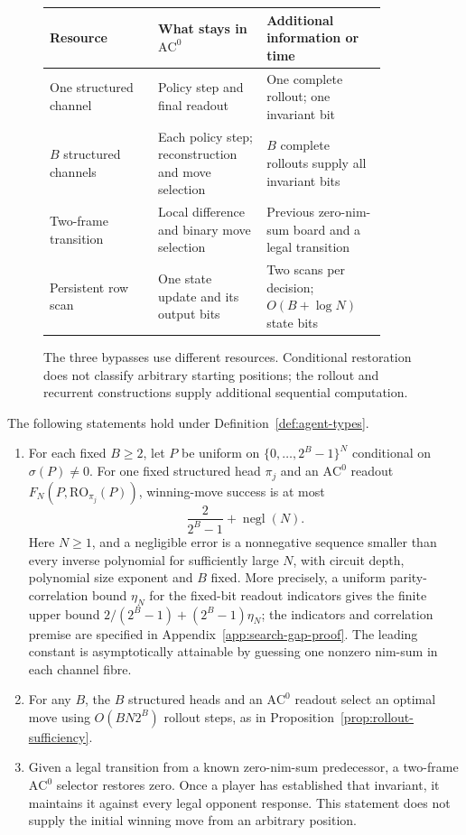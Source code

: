 \documentclass[twoside,11pt]{article}
\newcommand{\AC}{\mathrm{AC}}
\numberwithin{theorem}{section}
\numberwithin{equation}{section}
\begin{document}
\begin{figure}[t]
\centering
\begin{tabular}{>{\raggedright\arraybackslash}p{0.28\linewidth}>{\raggedright\arraybackslash}p{0.29\linewidth}>{\raggedright\arraybackslash}p{0.31\linewidth}}
\hline
\textbf{Resource} & \textbf{What stays in $\AC^0$} & \textbf{Additional information or time} \\
\hline
One structured channel & Policy step and final readout & One complete rollout; one invariant bit \\
$B$ structured channels & Each policy step; reconstruction and move selection & $B$ complete rollouts supply all invariant bits \\
Two-frame transition & Local difference and binary move selection & Previous zero-nim-sum board and a legal transition \\
Persistent row scan & One state update and its output bits & Two scans per decision; $O(B+\log N)$ state bits \\
\hline
\end{tabular}
\caption{The three bypasses use different resources. Conditional restoration does not classify arbitrary starting positions; the rollout and recurrent constructions supply additional sequential computation.}
\label{fig:rollout_gap}
\end{figure}

\begin{theorem}
\label{thm:search-gap}
The following statements hold under Definition~\ref{def:agent-types}.
\begin{enumerate}
\item[\textup{(i)}] For each fixed $B\ge2$, let $P$ be uniform on $\{0,\ldots,2^B-1\}^N$ conditional on $\sigma(P)\ne0$. For one fixed structured head $\pi_j$ and an $\AC^0$ readout $F_N(P,\mathrm{RO}_{\pi_j}(P))$, winning-move success is at most
\[
\frac{2}{2^B-1}+\operatorname{negl}(N).
\]
Here $N\ge1$, and a negligible error is a nonnegative sequence smaller than every inverse polynomial for sufficiently large $N$, with circuit depth, polynomial size exponent and $B$ fixed. More precisely, a uniform parity-correlation bound $\eta_N$ for the fixed-bit readout indicators gives the finite upper bound $2/(2^B-1)+(2^B-1)\eta_N$; the indicators and correlation premise are specified in Appendix~\ref{app:search-gap-proof}. The leading constant is asymptotically attainable by guessing one nonzero nim-sum in each channel fibre.
\item[\textup{(ii)}] For any $B$, the $B$ structured heads and an $\AC^0$ readout select an optimal move using $O(BN2^B)$ rollout steps, as in Proposition~\ref{prop:rollout-sufficiency}.
\item[\textup{(iii)}] Given a legal transition from a known zero-nim-sum predecessor, a two-frame $\AC^0$ selector restores zero. Once a player has established that invariant, it maintains it against every legal opponent response. This statement does not supply the initial winning move from an arbitrary position.
\end{enumerate}
\end{theorem}
\end{document}
